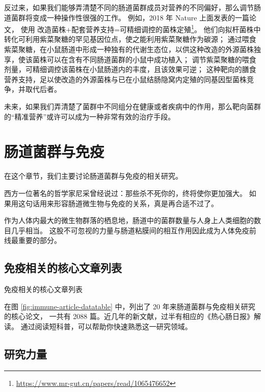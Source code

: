 \documentclass[]{ctexbook}
\renewcommand{\href}[2]{#2\footnote{\url{#1}}}
\begin{document}
反过来，如果我们能够弄清楚不同的肠道菌群成员对营养的不同偏好，那么调节肠道菌群将变成一种操作性很强的工作。
例如，2018 年 Nature 上面发表的一篇论文，
使用 \href{https://www.mr-gut.cn/papers/read/1065476652}{改造菌株+配套营养支持=可精细调控的菌株定殖}。
他们向拟杆菌株中转化可利用紫菜聚糖的罕见基因位点，使之能利用紫菜聚糖作为碳源；
通过喂食紫菜聚糖，在小鼠肠道中形成一种独有的代谢生态位，以供这种改造的外源菌株独享，使该菌株可以在含有不同肠道菌群的小鼠中成功植入；
调节紫菜聚糖的喂食剂量，可精细调控该菌株在小鼠肠道内的丰度，且该效果可逆；
这种靶向的膳食营养支持，足以使改造的外源菌株与已在小鼠结肠隐窝内定殖的同基因型菌株竞争，并取代后者。

未来，如果我们弄清楚了菌群中不同组分在健康或者疾病中的作用，那么靶向菌群的``精准营养''或许可以成为一种非常有效的治疗手段。

\hypertarget{immunity}{%
\chapter{肠道菌群与免疫}\label{immunity}}

在这个章节，我们主要讨论肠道菌群与免疫的相关研究。

西方一位著名的哲学家尼采曾经说过：那些杀不死你的，终将使你更加强大。
如果用这句话用来形容肠道微生物与免疫的关系，真是再合适不过了。

作为人体内最大的微生物群落的栖息地，肠道中的菌群数量与人身上人类细胞的数目几乎相当。
这股不可忽视的力量与肠道粘膜间的相互作用因此成为人体免疫前线最重要的部分。

\hypertarget{ux514dux75abux76f8ux5173ux7684ux6838ux5fc3ux6587ux7ae0ux5217ux8868}{%
\section{免疫相关的核心文章列表}\label{ux514dux75abux76f8ux5173ux7684ux6838ux5fc3ux6587ux7ae0ux5217ux8868}}

\hypertarget{htmlwidget-452485524d5a51c925ea}{}

\label{fig:immune-article-datatable}免疫相关的核心文章列表

在图 \ref{fig:immune-article-datatable} 中，列出了 20 年来肠道菌群与免疫相关研究的核心论文，
一共有 2088 篇。近几年的新文献，过半有相应的《热心肠日报》解读。
通过阅读短科普，可以帮助你快速熟悉这一研究领域。

\hypertarget{ux7814ux7a76ux529bux91cf}{%
\section{研究力量}\label{ux7814ux7a76ux529bux91cf}}
\end{document}
